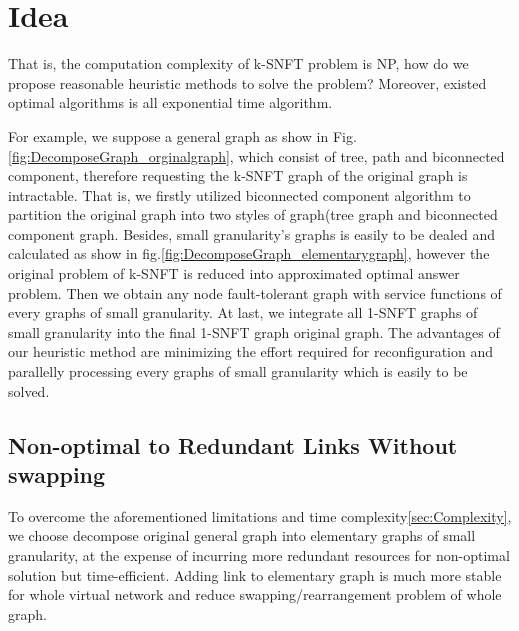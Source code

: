 
\section{Idea}
That is, the computation complexity of k-SNFT problem is NP, how do we propose reasonable heuristic methods to solve the problem? Moreover, existed optimal algorithms is all exponential time algorithm.


For example, we suppose a general graph as show in Fig.\ref{fig:DecomposeGraph_orginalgraph}, which consist of tree, path and biconnected component, therefore requesting the k-SNFT graph of the original graph is intractable. That is, we firstly utilized biconnected component algorithm to partition the original graph into two styles of graph(tree graph and biconnected component graph. Besides, small granularity's graphs is easily to be dealed and calculated as show in fig.\ref{fig:DecomposeGraph_elementarygraph}, however the original problem of k-SNFT is reduced into approximated optimal answer problem. Then we obtain any node fault-tolerant graph with service functions of every graphs of small granularity. At last, we integrate all 1-SNFT graphs of small granularity into the final 1-SNFT graph original graph. The advantages of our heuristic method are minimizing the effort required for reconfiguration and parallelly processing every graphs of small granularity which is easily to be solved.

\subsection{Non-optimal to Redundant Links Without swapping}
To overcome the aforementioned limitations and time complexity\ref{sec:Complexity}, we choose decompose original general graph into elementary graphs of small granularity, at the expense of incurring more redundant resources for non-optimal solution but time-efficient. Adding link to elementary graph is much more stable for whole virtual network and reduce swapping/rearrangement problem of whole graph.

